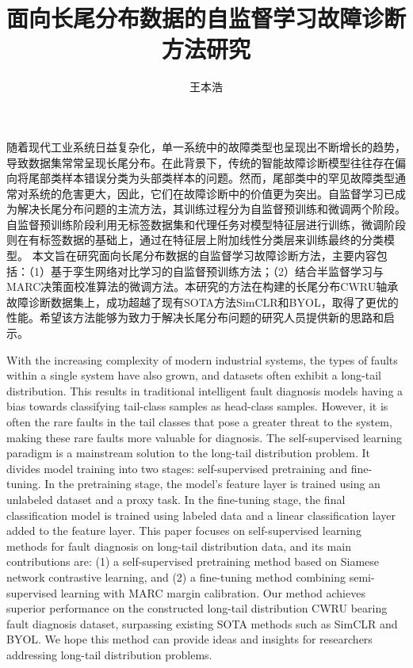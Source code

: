 \documentclass[master]{thesis-uestc}
\title{面向长尾分布数据的自监督学习故障诊断方法研究}{}
\author{王本浩}{Wang Benhao}
\begin{document}
\makecover

\begin{chineseabstract}
    随着现代工业系统日益复杂化，单一系统中的故障类型也呈现出不断增长的趋势，导致数据集常常呈现长尾分布。在此背景下，传统的智能故障诊断模型往往存在偏向将尾部类样本错误分类为头部类样本的问题。然而，尾部类中的罕见故障类型通常对系统的危害更大，因此，它们在故障诊断中的价值更为突出。自监督学习已成为解决长尾分布问题的主流方法，其训练过程分为自监督预训练和微调两个阶段。自监督预训练阶段利用无标签数据集和代理任务对模型特征层进行训练，微调阶段则在有标签数据的基础上，通过在特征层上附加线性分类层来训练最终的分类模型。
    本文旨在研究面向长尾分布数据的自监督学习故障诊断方法，主要内容包括：（1）基于孪生网络对比学习的自监督预训练方法；（2）结合半监督学习与MARC决策面校准算法的微调方法。本研究的方法在构建的长尾分布CWRU轴承故障诊断数据集上，成功超越了现有SOTA方法SimCLR和BYOL，取得了更优的性能。希望该方法能够为致力于解决长尾分布问题的研究人员提供新的思路和启示。

\end{chineseabstract}

\begin{englishabstract}
    With the increasing complexity of modern industrial systems, the types of faults within a single system have also grown, and datasets often exhibit a long-tail distribution. This results in traditional intelligent fault diagnosis models having a bias towards classifying tail-class samples as head-class samples. However, it is often the rare faults in the tail classes that pose a greater threat to the system, making these rare faults more valuable for diagnosis. The self-supervised learning paradigm is a mainstream solution to the long-tail distribution problem. It divides model training into two stages: self-supervised pretraining and fine-tuning. In the pretraining stage, the model's feature layer is trained using an unlabeled dataset and a proxy task. In the fine-tuning stage, the final classification model is trained using labeled data and a linear classification layer added to the feature layer. This paper focuses on self-supervised learning methods for fault diagnosis on long-tail distribution data, and its main contributions are: (1) a self-supervised pretraining method based on Siamese network contrastive learning, and (2) a fine-tuning method combining semi-supervised learning with MARC margin calibration. Our method achieves superior performance on the constructed long-tail distribution CWRU bearing fault diagnosis dataset, surpassing existing SOTA methods such as SimCLR and BYOL. We hope this method can provide ideas and insights for researchers addressing long-tail distribution problems.

\end{englishabstract}
\end{document}
